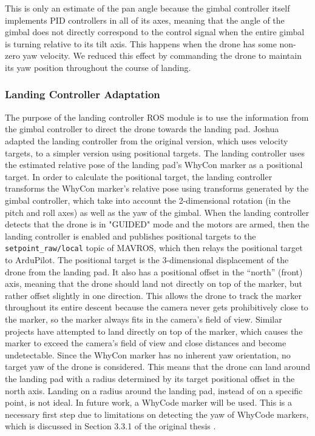 This is only an estimate of the pan angle because the gimbal controller itself implements PID controllers in all of its axes, meaning that the angle of the gimbal does not directly correspond to the control signal when the entire gimbal is turning relative to its tilt axis. This happens when the drone has some non-zero yaw velocity. We reduced this effect by commanding the drone to maintain its yaw position throughout the course of landing.

\subsubsection{Landing Controller Adaptation} 

The purpose of the landing controller ROS module \cite{landing_controller_github} is to use the information from the gimbal controller to direct the drone towards the landing pad. Joshua adapted the landing controller from the original version, which uses velocity targets, to a simpler version using positional targets. The landing controller uses the estimated relative pose of the landing pad's WhyCon marker as a positional target. In order to calculate the positional target, the landing controller transforms the WhyCon marker's relative pose using transforms generated by the gimbal controller, which take into account the 2-dimensional rotation (in the pitch and roll axes) as well as the yaw of the gimbal.  When the landing controller detects that the drone is in "GUIDED" mode and the motors are armed, then the landing controller is enabled and publishes positional targets to the \texttt{setpoint\_raw/local} topic of MAVROS, which then relays the positional target to ArduPilot. The positional target is the 3-dimensional displacement of the drone from the landing pad. It also has a positional offset in the ``north'' (front) axis, meaning that the drone should land not directly on top of the marker, but rather offset slightly in one direction. This allows the drone to track the marker throughout its entire descent because the camera never gets prohibitively close to the marker, so the marker always fits in the camera's field of view. Similar projects have attempted to land directly on top of the marker, which causes the marker to exceed the camera's field of view and close distances and become undetectable. Since the WhyCon marker has no inherent yaw orientation, no target yaw of the drone is considered. This means that the drone can land around the landing pad with a radius determined by its target positional offset in the north axis. Landing on a radius around the landing pad, instead of on a specific point, is not ideal. In future work, a WhyCode marker will be used. This is a necessary first step due to limitations on detecting the yaw of WhyCode markers, which is discussed in Section 3.3.1 of the original thesis \cite{AL_thesis}.
